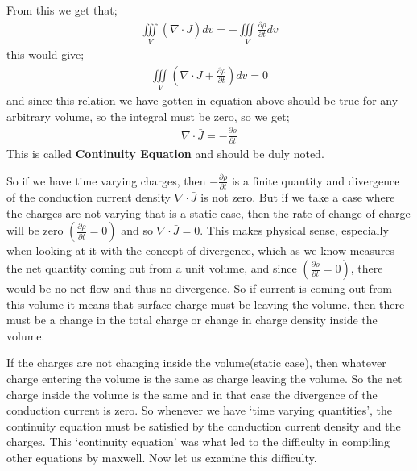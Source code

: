 From this we get that;
\begin{align*}
\iiint\limits_V(\nabla\cdot\bar{J})dv = -\iiint\limits_V\frac{\partial\rho}{\partial t}dv
\end{align*}
this would give;
\begin{align*}
\iiint\limits_V(\nabla\cdot\bar{J} + \frac{\partial\rho}{\partial t} )dv = 0
\end{align*}
and since this relation we have gotten in equation above should be true for any arbitrary volume, so the integral must be zero, so we get;
\begin{align}
\nabla\cdot\bar{J} = -\frac{\partial\rho}{\partial t}
\end{align}
This is called \textbf{Continuity Equation} and should be duly noted.

So if we have time varying charges, then $-\frac{\partial\rho}{\partial t}$ is a finite quantity and divergence of the conduction current density $\nabla\cdot\bar{J}$ is not zero. But if we take a case where the charges are not varying that is a static case, then the rate of change of charge will be zero $(\frac{\partial\rho}{\partial t}=0)$ and so $\nabla\cdot\bar{J}=0$. This makes physical sense, especially when looking at it with the concept of divergence, which as we know measures the net quantity coming out from a unit volume, and since $(\frac{\partial\rho}{\partial t}=0)$, there would be no net flow and thus no divergence. So if current is coming out from this volume it means that surface charge must be leaving the volume, then there must be a change in the total charge or change in charge density inside the volume.

If the charges are not changing inside the volume(static case), then whatever charge entering the volume is the same as charge leaving the volume. So the net charge inside the volume is the same and in that case the divergence of the conduction current is zero. So whenever we have `time varying quantities', the continuity equation must be satisfied by the conduction current density and the charges. This `continuity equation' was what led to the difficulty in compiling other equations by maxwell. Now let us examine this difficulty.

